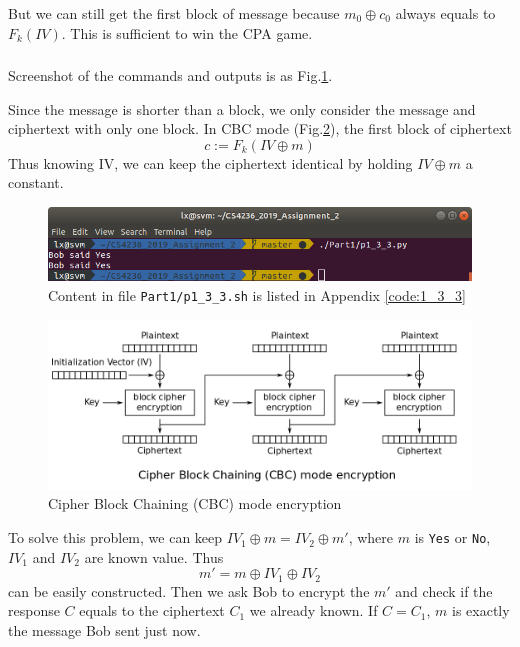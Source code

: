 But we can still get the first block of message because $m_0 \oplus c_0$ always equals to $F_k(IV)$. This is sufficient to win the CPA game.

\subsubsection{}

Screenshot of the commands and outputs is as Fig.\ref{fig:p1_3_3}.

Since the message is shorter than a block, we only consider the message and ciphertext with only one block.
In CBC mode (Fig.\ref{fig:CBC_encryption}), the first block of ciphertext 
$$c := F_k(IV \oplus m)$$
Thus knowing IV, we can keep the ciphertext identical by holding $IV \oplus m$ a constant.

\begin{figure}[t!]
\centering
\includegraphics[width=\columnwidth]{resources/p1_3_3.png}
\caption{
    Content in file \texttt{Part1/p1\_3\_3.sh} is listed in Appendix \ref{code:1_3_3}
}
\label{fig:p1_3_3}
\end{figure}

\begin{figure}[ht]
\centering
\includegraphics[width=\columnwidth]{resources/CBC_encryption.png}
\caption{
    Cipher Block Chaining (CBC) mode encryption \protect\footnotemark
}
\label{fig:CBC_encryption}
\end{figure}


To solve this problem, we can keep $IV_1 \oplus m = IV_2 \oplus m'$, where $m$ is \texttt{Yes} or \texttt{No}, $IV_1$ and $IV_2$ are known value. Thus
$$ m' = m \oplus IV_1 \oplus IV_2 $$
can be easily constructed. Then we ask Bob to encrypt the $m'$ and check if the response $C$ equals to the ciphertext $C_1$ we already known. If $C = C_1$, $m$ is exactly the message Bob sent just now.
